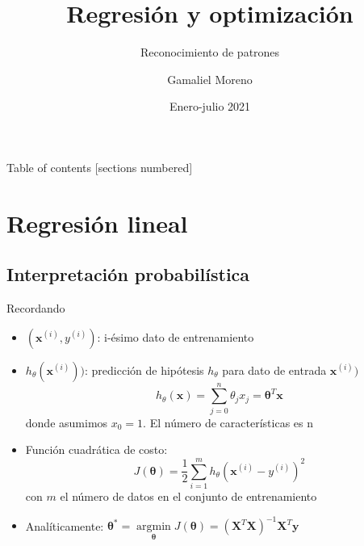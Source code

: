 \documentclass[10pt]{beamer}
\title{Regresión y optimización}
\subtitle{Reconocimiento de patrones}
\author{Gamaliel Moreno}
\institute{UAZ-MCPI}
\date{Enero-julio 2021}
\DeclareMathOperator*{\argmin}{argmin} %
\begin{document}
\begin{frame}
    \titlepage
\end{frame} 


\begin{frame}{Table of contents}
  [sections numbered]
  \tableofcontents%
\end{frame}

\section{Regresión lineal}
\subsection{Interpretación probabilística}
\begin{frame}[fragile]{Recordando}

\begin{itemize}
\item $(\boldsymbol{x}^{(i)}, y^{(i)})$: i-ésimo dato de entrenamiento 
\item $h_{\theta}(\boldsymbol{x}^{(i)}))$: predicción de hipótesis $h_{\theta}$ para dato de entrada $\boldsymbol{x}^{(i)})$ 
\begin{equation*}
h_{\theta}(\boldsymbol{x}) = \sum_{j=0}^{n}{\theta_{j}x_{j}}= \boldsymbol{\theta}^{T}\boldsymbol{x}
\end{equation*}
donde asumimos $x_{0}=1$. El número de características es n
\item Función cuadrática de costo:
\begin{equation*}
J(\boldsymbol{\theta})= \frac{1}{2} \sum_{i=1}^{m}{h_{\theta}(\boldsymbol{x}^{(i)}- y^{(i)})^2}
\end{equation*}
con $m$ el número de datos en el conjunto de entrenamiento 
\item Analíticamente: $\boldsymbol{\theta}^{*}= \argmin\limits_{\boldsymbol{\theta}} J(\boldsymbol{\theta})= (\boldsymbol{X}^T\boldsymbol{X})^{-1} \boldsymbol{X}^T \boldsymbol{y}$
\end{itemize}
\end{frame}

\end{document}
